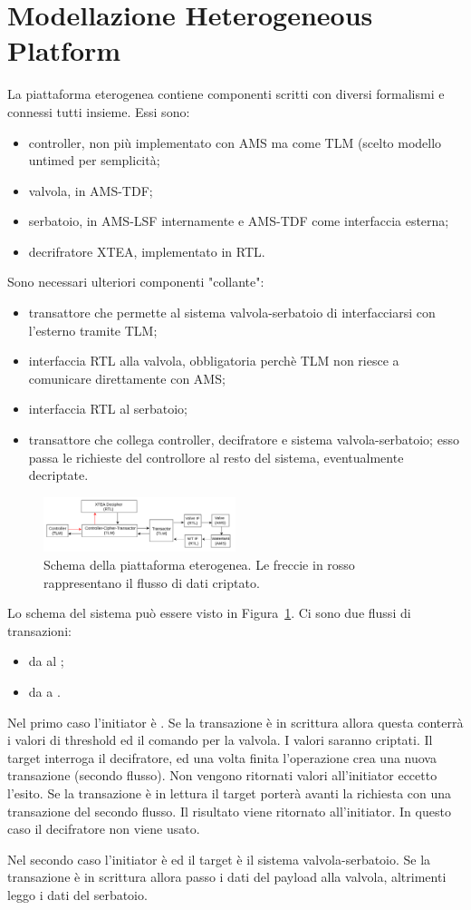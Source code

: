 \newpage
\section{Modellazione Heterogeneous Platform}

La piattaforma eterogenea contiene componenti scritti con diversi formalismi e connessi tutti insieme. Essi sono:
\begin{itemize}
    \item controller, non più implementato con AMS ma come TLM (scelto modello untimed per semplicità;
    \item valvola, in AMS-TDF;
    \item serbatoio, in AMS-LSF internamente e AMS-TDF come interfaccia esterna;
    \item decrifratore XTEA, implementato in RTL.
\end{itemize}
Sono necessari ulteriori componenti "collante":
\begin{itemize}
    \item transattore che permette al sistema valvola-serbatoio di interfacciarsi con l'esterno tramite TLM;
    \item interfaccia RTL alla valvola, obbligatoria perchè TLM non riesce a comunicare direttamente con AMS;
    \item interfaccia RTL al serbatoio;
    \item transattore che collega controller, decifratore e sistema valvola-serbatoio; esso passa le richieste del controllore al resto del sistema, eventualmente decriptate.
\end{itemize}

\begin{figure}[htbp]
    \centering
    \includegraphics[width=0.5\textwidth]{schemi/het-schema.png}
    \caption{Schema della piattaforma eterogenea. Le freccie in rosso rappresentano il flusso di dati criptato.}
    \label{fig:heterog-platform}
\end{figure}

Lo schema del sistema può essere visto in Figura~\ref{fig:heterog-platform}. Ci sono due flussi di transazioni:
\begin{itemize}
    \item da  al ;
    \item da  a .
\end{itemize}
Nel primo caso l'initiator è . Se la transazione è in scrittura allora questa conterrà i valori di threshold ed il comando per la valvola. I valori saranno criptati. Il target interroga il decifratore, ed una volta finita l'operazione crea una nuova transazione (secondo flusso). Non vengono ritornati valori all'initiator eccetto l'esito. Se la transazione è in lettura il target porterà avanti la richiesta con una transazione del secondo flusso. Il risultato viene ritornato all'initiator. In questo caso il decifratore non viene usato.

Nel secondo caso l'initiator è  ed il target è il sistema valvola-serbatoio. Se la transazione è in scrittura allora passo i dati del payload alla valvola, altrimenti leggo i dati del serbatoio. 